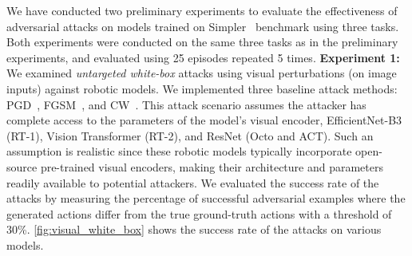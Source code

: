 We have conducted two preliminary experiments to evaluate the effectiveness of adversarial attacks on models trained on Simpler~\cite{li24simpler} benchmark using three tasks. Both experiments were conducted on the same three tasks as in the preliminary experiments, and evaluated using 25 episodes repeated 5 times.
\textbf{Experiment 1:} We examined \emph{untargeted white-box} attacks using visual perturbations (\ie on image inputs) against robotic models. We implemented three baseline attack methods: PGD~\cite{madry2017towards}, FGSM~\cite{goodfellow2014explaining}, and CW~\cite{carlini2017towards}. This attack scenario assumes the attacker has complete access to the parameters of the model's visual encoder, \ie EfficientNet-B3 (RT-1), Vision Transformer (RT-2), and ResNet (Octo and ACT). Such an assumption is realistic since these robotic models typically incorporate open-source pre-trained visual encoders, making their architecture and parameters readily available to potential attackers.
We evaluated the success rate of the attacks by measuring the percentage of successful adversarial examples where the generated actions differ from the true ground-truth actions with a threshold of 30\%. \autoref{fig:visual_white_box} shows the success rate of the attacks on various models. %

